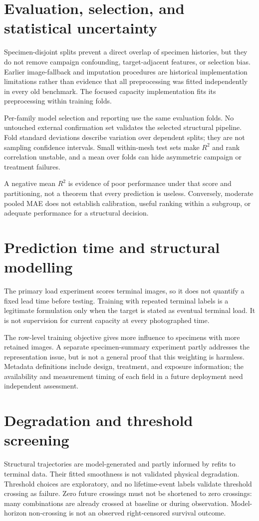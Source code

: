 \section{Evaluation, selection, and statistical uncertainty}
Specimen-disjoint splits prevent a direct overlap of specimen histories, but they do not remove campaign confounding, target-adjacent features, or selection bias. Earlier image-fallback and imputation procedures are historical implementation limitations rather than evidence that all preprocessing was fitted independently in every old benchmark. The focused capacity implementation fits its preprocessing within training folds.

Per-family model selection and reporting use the same evaluation folds. No untouched external confirmation set validates the selected structural pipeline. Fold standard deviations describe variation over dependent splits; they are not sampling confidence intervals. Small within-mesh test sets make $R^2$ and rank correlation unstable, and a mean over folds can hide asymmetric campaign or treatment failures.

A negative mean $R^2$ is evidence of poor performance under that score and partitioning, not a theorem that every prediction is useless. Conversely, moderate pooled MAE does not establish calibration, useful ranking within a subgroup, or adequate performance for a structural decision.

\section{Prediction time and structural modelling}
The primary load experiment scores terminal images, so it does not quantify a fixed lead time before testing. Training with repeated terminal labels is a legitimate formulation only when the target is stated as eventual terminal load. It is not supervision for current capacity at every photographed time.

The row-level training objective gives more influence to specimens with more retained images. A separate specimen-summary experiment partly addresses the representation issue, but is not a general proof that this weighting is harmless. Metadata definitions include design, treatment, and exposure information; the availability and measurement timing of each field in a future deployment need independent assessment.

\section{Degradation and threshold screening}
Structural trajectories are model-generated and partly informed by refits to terminal data. Their fitted smoothness is not validated physical degradation. Threshold choices are exploratory, and no lifetime-event labels validate threshold crossing as failure. Zero future crossings must not be shortened to zero crossings: many combinations are already crossed at baseline or during observation. Model-horizon non-crossing is not an observed right-censored survival outcome.

